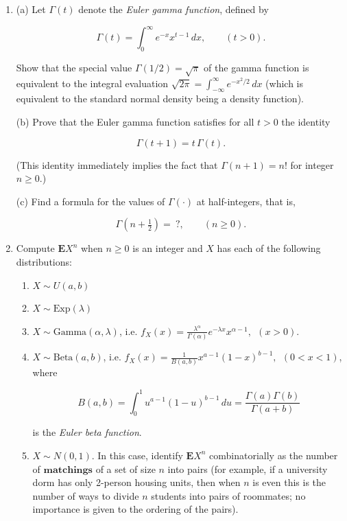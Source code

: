 \begin{enumerate}[label=\arabic*.]
\item (a) Let $\Gamma(t)$ denote the \emph{Euler gamma
function}, defined by

\[
\Gamma(t) = \int_0^\infty e^{-x} x^{t-1}\,dx, \qquad (t>0).
\]

\noindent Show that the special value $\Gamma(1/2)=\sqrt{\pi}$
of the gamma function is equivalent to the integral
evaluation
$\sqrt{2\pi} = \int_{-\infty}^\infty e^{-x^2/2}\,dx$
(which is equivalent to the standard normal density
being a density function).

(b) Prove that the Euler gamma function satisfies for
all $t>0$ the identity

\[
\Gamma(t+1)=t\,\Gamma(t).
\]

\noindent (This identity immediately implies the fact that
$\Gamma(n+1)=n!$ for integer $n\ge 0$.)

(c) Find a formula for the values of $\Gamma(\cdot)$
at half-integers, that is,

\[
\Gamma\left(n+\tfrac12\right) =\ ?, \qquad (n\ge 0).
\]

\item Compute $\mathbf{E} X^n$ when $n\ge 0$ is an integer
and $X$ has each of the following distributions:

\begin{enumerate}[label=(\alph*)]
\item $X\sim U(a,b)$

\item $X\sim \textrm{Exp}(\lambda)$

\item $X\sim \textrm{Gamma}(\alpha, \lambda)$, i.e.
$f_{X}(x) =
\frac{\lambda^\alpha}{\Gamma(\alpha)}e^{-\lambda x}
x^{\alpha-1}, \ \  (x>0)$.

\item $X\sim \textrm{Beta}(a, b)$, i.e.
$f_X(x) = \frac{1}{B(a,b)} x^{a-1} (1-x)^{b-1}, \ \
(0<x<1)$,
where

\[
B(a,b)=\int_0^1 u^{a-1}(1-u)^{b-1}\,du = \frac{\Gamma(a)\Gamma(b)}{\Gamma(a+b)}
\]

\noindent is the \emph{Euler beta function}.

\item $X\sim N(0,1)$. In this case, identify
$\mathbf{E} X^n$ combinatorially as the number of
$\textbf{matchings}$ of a set of size $n$ into pairs
(for example, if a university dorm has only 2-person
housing units, then when $n$ is even this is the
number of ways to divide $n$ students into pairs of
roommates; no importance is given to the ordering of
the pairs).


\end{enumerate}
\end{enumerate}
